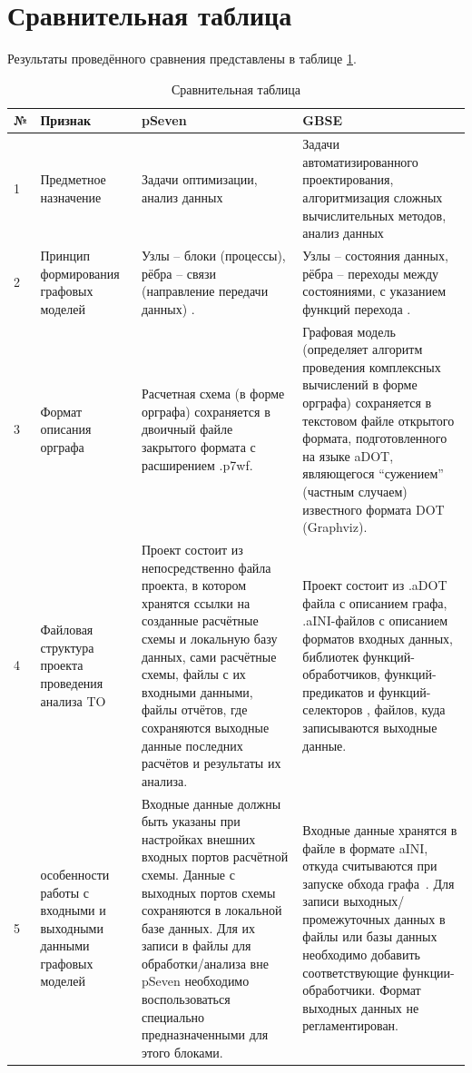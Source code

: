 \section{Сравнительная таблица}
Результаты проведённого сравнения представлены в таблице \ref{rndhpcblo.0209}.

\begin{landscape}
\begin{longtable}{|p{}|p{}|p{}|p{}|}
    \caption{Сравнительная таблица}\label{rndhpcblo.0209} \\
    \hline
    \textbf{№} & \textbf{Признак} & \textbf{pSeven} & \textbf{GBSE} \\
    \hline
    1 & Предметное назначение & Задачи оптимизации, анализ данных & Задачи автоматизированного проектирования, алгоритмизация сложных вычислительных методов, анализ данных \\
    \hline
    2 & Принцип формирования графовых моделей & Узлы -- блоки (процессы), рёбра -- связи (направление передачи данных) \cite{Nazarenko2015}. & Узлы -- состояния данных, рёбра -- переходы между состояниями, с указанием функций перехода \cite{SokolovPershin2018}. \\
    \hline
    3 & Формат описания орграфа & Расчетная схема (в форме орграфа) сохраняется в двоичный файле закрытого формата с расширением \textsf{.p7wf}. & Графовая модель (определяет алгоритм проведения комплексных вычислений в форме орграфа) сохраняется в текстовом файле открытого формата, подготовленного на языке \gls{aDOT}\cite{SokolovADOT2020}, являющегося ``сужением'' (частным случаем) известного формата DOT (Graphviz). \\
    \hline
    4 & Файловая структура проекта проведения анализа \gls{TO} & Проект состоит из непосредственно файла проекта, в котором хранятся ссылки на созданные расчётные схемы и локальную базу данных, сами расчётные схемы, файлы с их входными данными, файлы отчётов, где сохраняются выходные данные последних расчётов и результаты их анализа. & Проект состоит из \textsf{.aDOT} файла с описанием графа, \textsf{.aINI}-файлов с описанием форматов входных данных, библиотек функций-обработчиков, функций-предикатов и функций-селекторов , файлов, куда записываются выходные данные. \\
    \hline
    5 & особенности работы с входными и выходными данными графовых моделей & Входные данные должны быть указаны при настройках внешних входных портов расчётной схемы. Данные с выходных портов схемы сохраняются в локальной базе данных. Для их записи в файлы для обработки/анализа вне pSeven необходимо воспользоваться специально предназначенными для этого блоками. & Входные данные хранятся в файле в формате \gls{aINI}\cite{SokAINI}, откуда считываются при запуске обхода графа~\cite{SokolovPershin2017}. Для записи выходных/промежуточных данных в файлы или базы данных необходимо добавить соответствующие функции-обработчики. Формат выходных данных не регламентирован. \\

\end{longtable}
\end{landscape}
